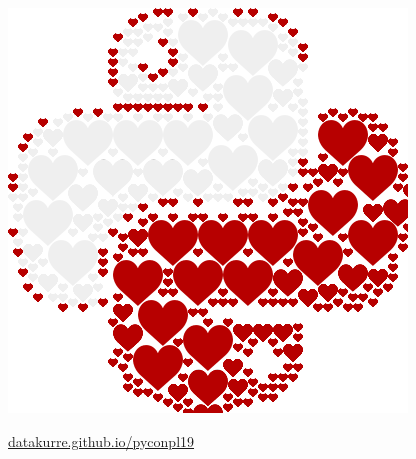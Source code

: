 \documentclass[12pt,aspectratio=169]{beamer}
\begin{document}
\begin{frame}[standout]
\vfill
\includegraphics[height=0.50\paperheight]{images/pyconplhearts.png}
\par
\href{https://datakurre.github.io/pyconpl19/}{datakurre.github.io/pyconpl19}
\end{frame}

\end{document}
